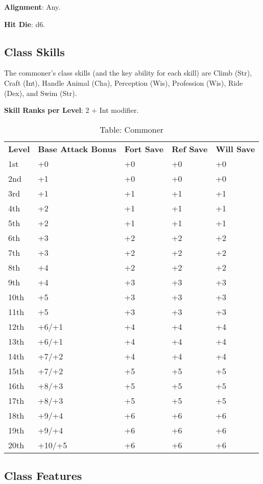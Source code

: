 				
\textbf{Alignment}: Any.
				
\textbf{Hit Die}: d6.
				
\subsection{Class Skills}

				
The commoner's class skills (and the key ability for each skill) are Climb (Str), Craft (Int), Handle Animal (Cha), Perception (Wis), Profession (Wis), Ride (Dex), and Swim (Str).
				
\textbf{Skill Ranks per Level}: 2 + Int modifier.
\begin{table}[]
\sffamily
\caption{Table: Commoner}
\begin{tabular}{lllll}
\textbf{Level} & \textbf{Base Attack Bonus} & \textbf{Fort Save} & \textbf{Ref Save} & \textbf{Will Save} \\
1st & +0 & +0 & +0 & +0\\
2nd & +1 & +0 & +0 & +0\\
3rd & +1 & +1 & +1 & +1\\
4th & +2 & +1 & +1 & +1\\
5th & +2 & +1 & +1 & +1\\
6th & +3 & +2 & +2 & +2\\
7th & +3 & +2 & +2 & +2\\
8th & +4 & +2 & +2 & +2\\
9th & +4 & +3 & +3 & +3\\
10th & +5 & +3 & +3 & +3\\
11th & +5 & +3 & +3 & +3\\
12th & +6/+1 & +4 & +4 & +4\\
13th & +6/+1 & +4 & +4 & +4\\
14th & +7/+2 & +4 & +4 & +4\\
15th & +7/+2 & +5 & +5 & +5\\
16th & +8/+3 & +5 & +5 & +5\\
17th & +8/+3 & +5 & +5 & +5\\
18th & +9/+4 & +6 & +6 & +6\\
19th & +9/+4 & +6 & +6 & +6\\
20th & +10/+5 & +6 & +6 & +6\\
\end{tabular}
\end{table}

				
\subsection{Class Features}

